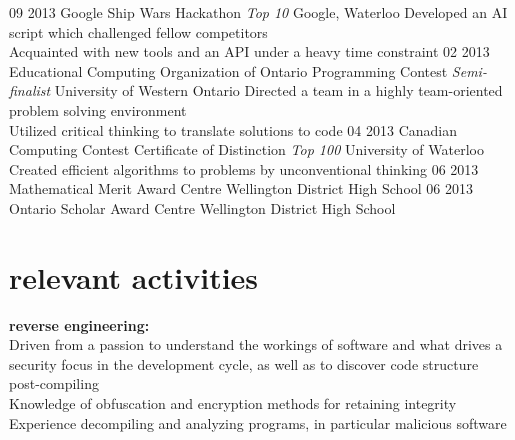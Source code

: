 \documentclass[]{friggeri-cv}
\begin{document}
\begin{entrylist}
  \entry
  	{09 2013}
  	{Google Ship Wars Hackathon \textsf{\em{Top 10}}}
  	{Google, Waterloo}
  	{Developed an AI script which challenged fellow competitors \\
  	 Acquainted with new tools and an API under a heavy time constraint}
  \entry
  	{02 2013}
  	{Educational Computing Organization of Ontario Programming Contest \textsf{\em{Semi-finalist}}}
  	{University of Western Ontario}
  	{Directed a team in a highly team-oriented problem solving environment \\
  	 Utilized critical thinking to translate solutions to code}
  \entry
	{04 2013}  	
  	{Canadian Computing Contest Certificate of Distinction \textsf{\em{Top 100}}}
  	{University of Waterloo}
  	{Created efficient algorithms to problems by unconventional thinking}
  \entry
  	{06 2013}
  	{Mathematical Merit Award}
  	{Centre Wellington District High School}
  	{}
  \entry
  	{06 2013}
  	{Ontario Scholar Award}
  	{Centre Wellington District High School}
  	{}

\end{entrylist}

\section{relevant activities}
{\bf reverse engineering: }\\
Driven from a passion to understand the workings of software and what drives a security focus \hspace*{5mm} in the development cycle, as well as to discover code structure post-compiling \\
Knowledge of obfuscation and encryption methods for retaining integrity \\
Experience decompiling and analyzing programs, in particular malicious software
\end{document}
